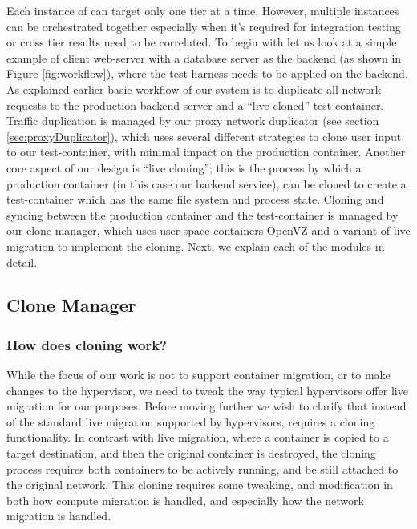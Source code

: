 Each instance of \parikshan can target only one tier at a time.
However, multiple instances can be orchestrated together especially when it's required for integration testing or cross tier results need to be correlated.
To begin with let us look at a simple example of client web-server with a database server as the backend (as shown in Figure \ref{fig:workflow}), where the test harness needs to be applied on the backend.
As explained earlier basic workflow of our system is to duplicate all network requests to the production backend server and a ``live cloned'' test container.
Traffic duplication is managed by our proxy network duplicator (see section \ref{sec:proxyDuplicator}), which uses several different strategies to clone user input to our test-container, with minimal impact on the production container.
Another core aspect of our design is ``live cloning''; this is the process by which a production container (in this case our backend service), can be cloned to create a test-container which has the same file system and process state. 
Cloning and syncing between the production container and the test-container is managed by our clone manager, which uses user-space containers OpenVZ\cite{openvz} and a variant of live migration to implement the cloning.
Next, we explain each of the modules in detail.


\subsection{Clone Manager} 
\label{sec:CloneManager}

\subsubsection{How does cloning work?}
\label{sec:cloning}

While the focus of our work is not to support container migration, or to make changes to the hypervisor, we need to tweak the way typical hypervisors offer live migration for our purposes.
Before moving further we wish to clarify that instead of the standard live migration supported by hypervisors, \parikshan requires a cloning functionality. 
In contrast with live migration, where a container is copied to a target destination, and then the original container is destroyed, the cloning process requires both containers to be actively running, and be still attached to the original network.
This cloning requires some tweaking, and modification in both how compute migration is handled, and especially how the network migration is handled. 

